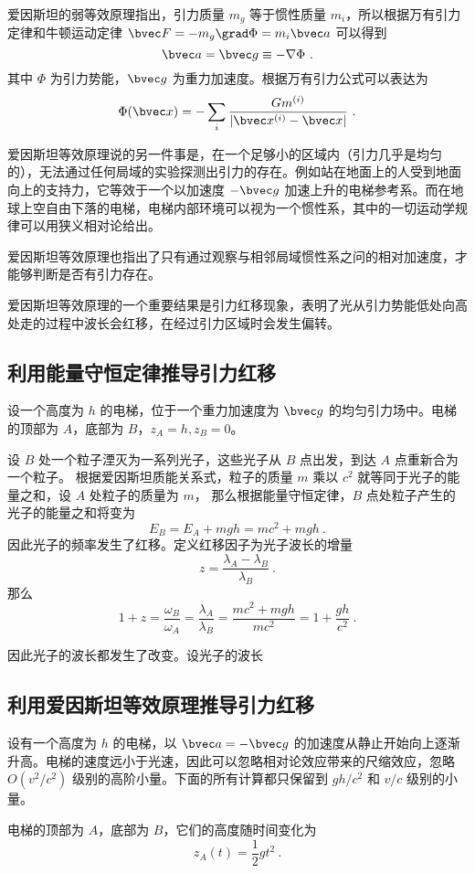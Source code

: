 

爱因斯坦的弱等效原理指出，引力质量 $m_g$ 等于惯性质量 $m_i$，所以根据万有引力定律和牛顿运动定律 $\bvec F=-m_g \grad \Phi = m_i \bvec a$ 可以得到 
\begin{equation}
\bvec a=\bvec g \equiv -\nabla\Phi~.
\end{equation}
其中 $\Phi$ 为引力势能，$\bvec g$ 为重力加速度。根据万有引力公式可以表达为
\begin{equation}
\Phi(\bvec x)=-\sum_{i} \frac{G m^{(i)}}{|\bvec x^{(i)}-\bvec x|}~.
\end{equation}

爱因斯坦等效原理说的另一件事是，在一个足够小的区域内（引力几乎是均匀的），无法通过任何局域的实验探测出引力的存在。例如站在地面上的人受到地面向上的支持力，它等效于一个以加速度 $-\bvec g$ 加速上升的电梯参考系。而在地球上空自由下落的电梯，电梯内部环境可以视为一个惯性系，其中的一切运动学规律可以用狭义相对论给出。

爱因斯坦等效原理也指出了只有通过观察与相邻局域惯性系之问的相对加速度，才能够判断是否有引力存在。

爱因斯坦等效原理的一个重要结果是引力红移现象，表明了光从引力势能低处向高处走的过程中波长会红移，在经过引力区域时会发生偏转。
\subsection{利用能量守恒定律推导引力红移}
设一个高度为 $h$ 的电梯，位于一个重力加速度为 $\bvec g$ 的均匀引力场中。电梯的顶部为 $A$，底部为 $B$，$z_A=h,z_B=0$。

设 $B$ 处一个粒子湮灭为一系列光子，这些光子从 $B$ 点出发，到达 $A$ 点重新合为一个粒子。
根据爱因斯坦质能关系式，粒子的质量 $m$ 乘以 $c^2$ 就等同于光子的能量之和，设 $A$ 处粒子的质量为 $m$，
那么根据能量守恒定律，$B$ 点处粒子产生的光子的能量之和将变为
\begin{equation}
E_B=E_A+mgh = mc^2+mgh~.
\end{equation}
因此光子的频率发生了红移。定义红移因子为光子波长的增量
\begin{equation}
z = \frac{\lambda_A-\lambda_B}{\lambda_B}~.
\end{equation}
那么
\begin{equation}
1+z=\frac{\omega_B}{\omega_A} = \frac{\lambda_A}{\lambda_B} = \frac{mc^2+mgh}{mc^2} = 1+\frac{gh}{c^2}~.
\end{equation}

因此光子的波长都发生了改变。设光子的波长

\subsection{利用爱因斯坦等效原理推导引力红移}
设有一个高度为 $h$ 的电梯，以 $\bvec a=-\bvec g$ 的加速度从静止开始向上逐渐升高。电梯的速度远小于光速，因此可以忽略相对论效应带来的尺缩效应，忽略 $O(v^2/c^2)$ 级别的高阶小量。下面的所有计算都只保留到 $gh/c^2$ 和 $v/c$ 级别的小量。

电梯的顶部为 $A$，底部为 $B$，它们的高度随时间变化为
\begin{equation}
z_A(t)=\frac{1}{2}gt^2~.
\end{equation}

